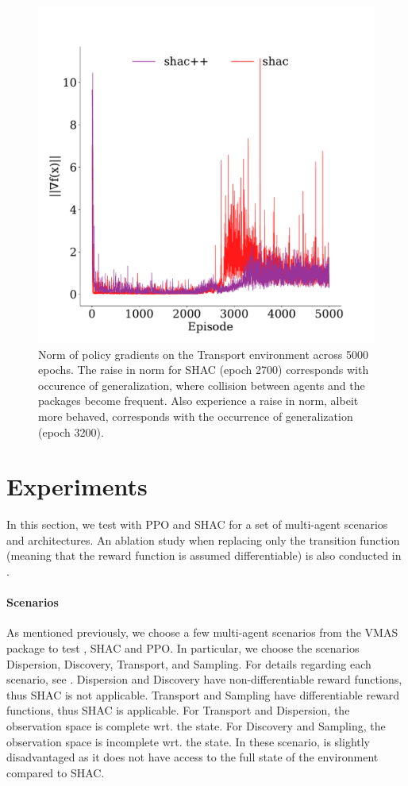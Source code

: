 \begin{figure}[t]
    \includegraphics[width=\columnwidth]{figs/grads-transformer-transport.pdf}
    \caption{Norm of policy gradients on the Transport environment across 5000 epochs. The raise in norm for SHAC (epoch 2700) corresponds with occurence of generalization, where collision between agents and the packages become frequent. Also \fname{} experience a raise in norm, albeit more behaved, corresponds with the occurrence of generalization (epoch 3200).}\label{fig:grads-transformer-transport}
\end{figure}

\section{Experiments}\label{sect:experiments}

In this section, we test \fname{} with PPO and SHAC for a set of multi-agent scenarios and architectures. An ablation study when replacing only the transition function (meaning that the reward function is assumed differentiable) is also conducted in .

\paragraph{Scenarios}
As mentioned previously, we choose a few multi-agent scenarios from the VMAS package to test \fname{}, SHAC and PPO. In particular, we choose the scenarios Dispersion, Discovery, Transport, and Sampling. For details regarding each scenario, see . Dispersion and Discovery have non-differentiable reward functions, thus SHAC is not applicable. Transport and Sampling have differentiable reward functions, thus SHAC is applicable. For Transport and Dispersion, the observation space is complete wrt. the state. For Discovery and Sampling, the observation space is incomplete wrt. the state. In these scenario, \fname{} is slightly disadvantaged as it does not have access to the full state of the environment compared to SHAC.

